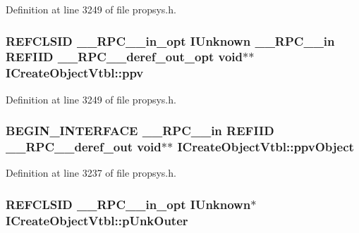 Definition at line 3249 of file propsys.\+h.

\subsubsection[{\texorpdfstring{ppv}{ppv}}]{ R\+E\+F\+C\+L\+S\+ID {\bf \+\_\+\+\_\+\+R\+P\+C\+\_\+\+\_\+in\+\_\+opt} I\+Unknown {\bf \+\_\+\+\_\+\+R\+P\+C\+\_\+\+\_\+in} {\bf R\+E\+F\+I\+ID} {\bf \+\_\+\+\_\+\+R\+P\+C\+\_\+\+\_\+deref\+\_\+out\+\_\+opt} {\bf void}$\ast$$\ast$ I\+Create\+Object\+Vtbl\+::ppv}\hypertarget{struct_i_create_object_vtbl_a6c2428e097234c69dd71b8cbb11b9649}{}\label{struct_i_create_object_vtbl_a6c2428e097234c69dd71b8cbb11b9649}


Definition at line 3249 of file propsys.\+h.

\subsubsection[{\texorpdfstring{ppv\+Object}{ppvObject}}]{\setlength{\rightskip}{0pt plus 5cm}B\+E\+G\+I\+N\+\_\+\+I\+N\+T\+E\+R\+F\+A\+CE {\bf \+\_\+\+\_\+\+R\+P\+C\+\_\+\+\_\+in} {\bf R\+E\+F\+I\+ID} {\bf \+\_\+\+\_\+\+R\+P\+C\+\_\+\+\_\+deref\+\_\+out} {\bf void}$\ast$$\ast$ I\+Create\+Object\+Vtbl\+::ppv\+Object}\hypertarget{struct_i_create_object_vtbl_a07386253c8750a69c117882c22603b6c}{}\label{struct_i_create_object_vtbl_a07386253c8750a69c117882c22603b6c}


Definition at line 3237 of file propsys.\+h.

\subsubsection[{\texorpdfstring{p\+Unk\+Outer}{pUnkOuter}}]{ R\+E\+F\+C\+L\+S\+ID {\bf \+\_\+\+\_\+\+R\+P\+C\+\_\+\+\_\+in\+\_\+opt} I\+Unknown$\ast$ I\+Create\+Object\+Vtbl\+::p\+Unk\+Outer}\hypertarget{struct_i_create_object_vtbl_a098bce5009406995edcc8919d6ceab3d}{}\label{struct_i_create_object_vtbl_a098bce5009406995edcc8919d6ceab3d}


